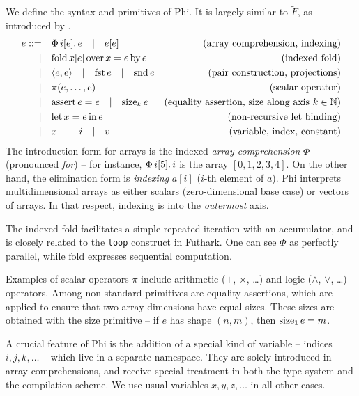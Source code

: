We define the syntax and primitives of Phi. It is largely similar to $\tilde F$, as introduced by \textcite{shaikhha2019efficient}.
\begin{align*}
e ::=&\quad \phivec{i}{e}{e} \quad|\quad e[e]   &\text{(array comprehension, indexing)} \\
|&\quad \phifold{x}{e}{x}{e}{e}  &\text{(indexed fold)} \\
|&\quad \phipair{e}{e} \quad|\quad \phifst{e} \quad|\quad \phisnd{e} &\text{(pair construction, projections)} \\
|&\quad \pi(e, \dots, e) &\text{(scalar operator)} \\
|&\quad \phiasserteq{e}{e} \quad|\quad \phisize{e}{k} &\text{(equality assertion, size along axis } k \in \mathbb N \text{)} \\
|&\quad \philet{x}{e}{e} &\text{(non-recursive let binding)} \\
|&\quad x \quad|\quad i \quad|\quad v &\text{(variable, index, constant)}
\end{align*}
The introduction form for arrays is the indexed \textit{array comprehension} $\Phi$ (pronounced \textit{for}) -- for instance, $\Phi\, {i}[{5}] \ldotp {i}$ is the array $[0, 1, 2, 3, 4]$. On the other hand, the elimination form is \textit{indexing} $a[i]$ ($i$-th element of $a$). Phi interprets multidimensional arrays as either scalars (zero-dimensional base case) or vectors of arrays. In that respect, indexing is into the \textit{outermost} axis. 

The indexed fold facilitates a simple repeated iteration with an accumulator, and is closely related to the \texttt{loop} construct in Futhark. One can see $\Phi$ as perfectly parallel, while $\mathrm{fold}$ expresses sequential computation.

Examples of scalar operators $\pi$ include arithmetic ($+$, $\times$, \dots) and logic ($\land$, $\lor$, \dots) operators. Among non-standard primitives are equality assertions, which are applied to ensure that two array dimensions have equal sizes. These sizes are obtained with the $\mathrm{size}$ primitive -- if $e$ has shape $(n, m)$, then $\mathrm{size}_{1}\, {e} = m$.

A crucial feature of Phi is the addition of a special kind of variable -- indices $i, j, k, \dots$ -- which live in a separate namespace. They are solely introduced in array comprehensions, and receive special treatment in both the type system and the compilation scheme. We use usual variables $x, y, z, \dots$ in all other cases.

